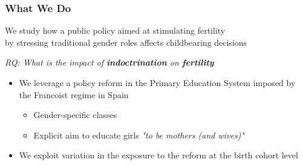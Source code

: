 \documentclass[aspectratio=169]{beamer}
\begin{document}
\begin{frame}
\frametitle{What We Do}
\centering
We study how a public policy aimed at stimulating fertility\\ by stressing traditional gender roles  affects childbearing decisions


\medskip
\centering
\downarrow

\begin{center}
    \textit{RQ: What is the impact of \textbf{indoctrination} on \textbf{fertility}}

\end{center}
\begin{itemize}
    
 \item We leverage a policy reform in the Primary Education System imposed by the Francoist regime in Spain
 \begin{itemize}
 
\medskip
     \item Gender-specific classes
          \medskip

     \item Explicit aim to educate girls \textit{"to be mothers (and wives)"} 
 \end{itemize}

          \medskip

 \item We exploit variation in the exposure to the reform at the birth cohort level 
           \medskip
%
\end{itemize}
 
\end{frame}
\end{document}
